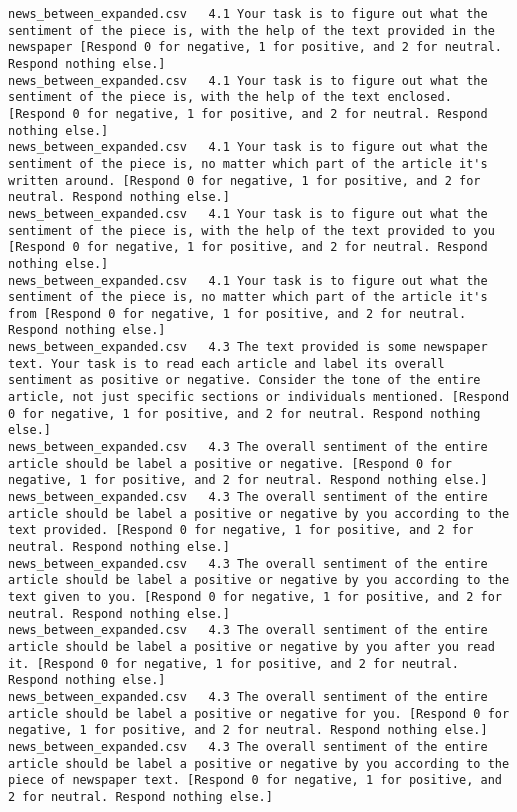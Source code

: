 \begin{lstlisting}[label=lst:promptvariants]
news_between_expanded.csv	4.1	Your task is to figure out what the sentiment of the piece is, with the help of the text provided in the newspaper [Respond 0 for negative, 1 for positive, and 2 for neutral. Respond nothing else.]
news_between_expanded.csv	4.1	Your task is to figure out what the sentiment of the piece is, with the help of the text enclosed. [Respond 0 for negative, 1 for positive, and 2 for neutral. Respond nothing else.]
news_between_expanded.csv	4.1	Your task is to figure out what the sentiment of the piece is, no matter which part of the article it's written around. [Respond 0 for negative, 1 for positive, and 2 for neutral. Respond nothing else.]
news_between_expanded.csv	4.1	Your task is to figure out what the sentiment of the piece is, with the help of the text provided to you [Respond 0 for negative, 1 for positive, and 2 for neutral. Respond nothing else.]
news_between_expanded.csv	4.1	Your task is to figure out what the sentiment of the piece is, no matter which part of the article it's from [Respond 0 for negative, 1 for positive, and 2 for neutral. Respond nothing else.]
news_between_expanded.csv	4.3	The text provided is some newspaper text. Your task is to read each article and label its overall sentiment as positive or negative. Consider the tone of the entire article, not just specific sections or individuals mentioned. [Respond 0 for negative, 1 for positive, and 2 for neutral. Respond nothing else.]
news_between_expanded.csv	4.3	The overall sentiment of the entire article should be label a positive or negative. [Respond 0 for negative, 1 for positive, and 2 for neutral. Respond nothing else.]
news_between_expanded.csv	4.3	The overall sentiment of the entire article should be label a positive or negative by you according to the text provided. [Respond 0 for negative, 1 for positive, and 2 for neutral. Respond nothing else.]
news_between_expanded.csv	4.3	The overall sentiment of the entire article should be label a positive or negative by you according to the text given to you. [Respond 0 for negative, 1 for positive, and 2 for neutral. Respond nothing else.]
news_between_expanded.csv	4.3	The overall sentiment of the entire article should be label a positive or negative by you after you read it. [Respond 0 for negative, 1 for positive, and 2 for neutral. Respond nothing else.]
news_between_expanded.csv	4.3	The overall sentiment of the entire article should be label a positive or negative for you. [Respond 0 for negative, 1 for positive, and 2 for neutral. Respond nothing else.]
news_between_expanded.csv	4.3	The overall sentiment of the entire article should be label a positive or negative by you according to the piece of newspaper text. [Respond 0 for negative, 1 for positive, and 2 for neutral. Respond nothing else.]

\end{lstlisting}
